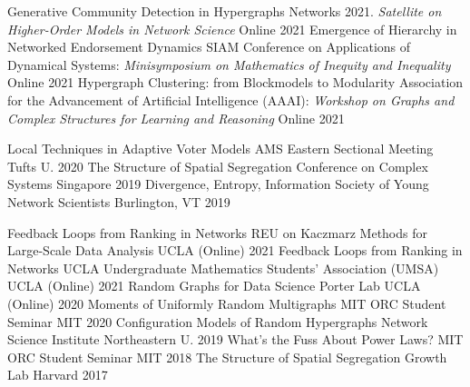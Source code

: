 

\nopagebreak
\begin{cvhonors}
    \cvhonor
        {Generative Community Detection in Hypergraphs} %
        {Networks 2021. \emph{Satellite on Higher-Order Models in Network Science}} %
        {Online} %
        {2021} %
    \cvhonor
        {Emergence of Hierarchy in Networked Endorsement Dynamics} %
        {SIAM Conference on Applications of Dynamical Systems: \emph{Minisymposium on Mathematics of Inequity and Inequality}} %
        {Online} %
        {2021} %
    \cvhonor
        {Hypergraph Clustering: from Blockmodels to Modularity} %
        {Association for the Advancement of Artificial Intelligence (AAAI): \emph{Workshop on Graphs and Complex Structures for Learning and Reasoning}} %
        {Online} %
        {2021} %
\end{cvhonors}
\begin{cvhonors}
      \cvhonor
        {Local Techniques in Adaptive Voter Models} %
        {AMS Eastern Sectional Meeting} %
        {Tufts U.} %
        {2020} %
    \cvhonor
        {The Structure of Spatial Segregation}
        {Conference on Complex Systems}
        {Singapore}
        {2019}
    \cvhonor
        {Divergence, Entropy, Information} %
        {Society of Young Network Scientists} %
        {Burlington, VT} %
        {2019} %
\end{cvhonors}

\nopagebreak
\begin{cvhonors}
    \cvhonor
        {Feedback Loops from Ranking in Networks}
        {REU on Kaczmarz Methods for Large-Scale Data Analysis}
        {UCLA (Online)}
        {2021}
    \cvhonor
        {Feedback Loops from Ranking in Networks} %
        {UCLA Undergraduate Mathematics Students' Association (UMSA)} %
        {UCLA (Online)} %
        {2021} %
    \cvhonor
        {Random Graphs for Data Science} %
        {Porter Lab} %
        {UCLA (Online)} %
        {2020} %
    \cvhonor
        {Moments of Uniformly Random Multigraphs} %
        {MIT ORC Student Seminar} %
        {MIT} %
        {2020} %
    \cvhonor
        {Configuration Models of Random Hypergraphs} %
        {Network Science Institute} %
        {Northeastern U. } %
        {2019} %
    \cvhonor
        {What's the Fuss About Power Laws?} %
        {MIT ORC Student Seminar} %
        {MIT} %
        {2018} %
    \cvhonor
        {The Structure of Spatial Segregation} %
        {Growth Lab} %
        {Harvard} %
        {2017} %
\end{cvhonors}

